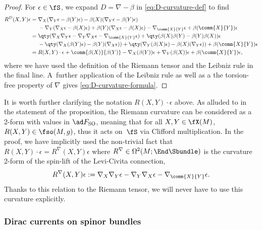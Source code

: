 \begin{proof}
	For $\epsilon\in\fS$, we expand $D=\nabla-\beta$ in \eqref{eq:D-curvature-def} to find
	\begin{align*}
		 R^D(X,Y)\epsilon	
			={}& \nabla_X(\nabla_Y\epsilon-\beta(Y)\epsilon) - \beta(X)(\nabla_Y\epsilon-\beta(Y)\epsilon)	\\
				& - \nabla_Y(\nabla_X\epsilon-\beta(X)\epsilon) + \beta(Y)(\nabla_X\epsilon-\beta(X)\epsilon)
				- \nabla_{\comm{X}{Y}}\epsilon + \beta({\comm{X}{Y}})\epsilon	\\
			={}& \qty(\nabla_X\nabla_Y\epsilon - \nabla_Y\nabla_X\epsilon - \nabla_{\comm{X}{Y}}\epsilon)
				+ \qty(\beta(X)\beta(Y)-\beta(Y)\beta(X))\epsilon	\\
				& - \qty(\nabla_X(\beta(Y)\epsilon)-\beta(Y)(\nabla_X\epsilon)) + \qty(\nabla_Y(\beta(X)\epsilon)
				- \beta(X)(\nabla_Y\epsilon)) + \beta({\comm{X}{Y}})\epsilon \\
			={}& R(X,Y)\cdot\epsilon + \comm{\beta(X)}{\beta(Y)} - \nabla_X(\beta(Y))\epsilon + \nabla_Y(\beta(X))\epsilon + \beta({\comm{X}{Y}})\epsilon,
	\end{align*}
	where we have used the definition of the Riemann tensor and the Leibniz rule in the final line. A~further application of the Leibniz rule as well as a the torsion-free property of $\nabla$ gives \eqref{eq:D-curvature-formula}.
\end{proof}

\begin{Remark}\label{rem:riemann-spinor-action}
	It is worth further clarifying the notation $R(X,Y)\cdot\epsilon$ above. As alluded to in the statement of the proposition, the Riemann curvature can be considered as a 2-form with values in $\ad F_{\rm SO}$, meaning that for all $X,Y\in \fX(M)$, $R(X,Y)\in\fso(M,g)$, thus it acts on~$\fS$ via Clifford multiplication. In the proof, we have implicitly used the non-trivial fact that~${R(X,Y)\cdot\epsilon=R^\nabla(X,Y)\epsilon}$ where $R^\nabla\in\Omega^2(M;\End \Sbundle)$ is the curvature 2-form of the spin-lift of the Levi-Civita connection,
\[
R^\nabla(X,Y)\epsilon:=\nabla_X\nabla_Y\epsilon-\nabla_Y\nabla_X\epsilon-\nabla_{\comm{X}{Y}}\epsilon.
\]
Thanks to this relation to the Riemann tensor, we will never have to use this curvature explicitly.
\end{Remark}

\subsubsection{Dirac currents on spinor bundles}
\label{sec:dirac-current-bundle}

